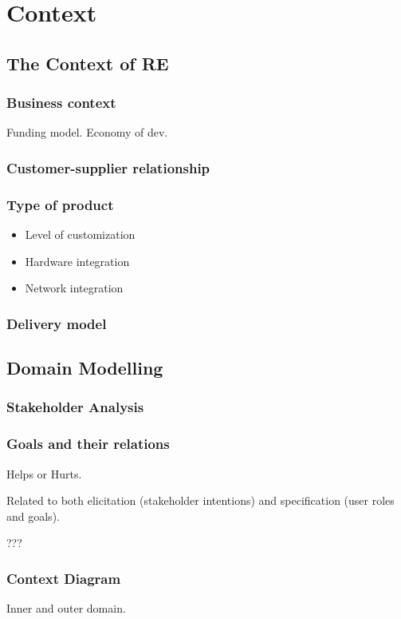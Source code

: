 
\chapter{Context}%

\section{The Context of RE}

\subsection{Business context}
Funding model. Economy of dev.

\subsection{Customer-supplier relationship}

\subsection{Type of product}

\begin{itemize}
  \item Level of customization
  \item Hardware integration
  \item Network integration
\end{itemize}

\subsection{Delivery model}


\section{Domain Modelling}

\subsection{Stakeholder Analysis}

\subsection{Goals and their relations}

Helps or Hurts.

Related to both elicitation (stakeholder intentions) and specification (user roles and goals).

???

\subsection{Context Diagram}

Inner and outer domain.







